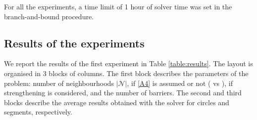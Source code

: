 \documentclass[a4paper,  review, authoryear, 1p., doubleblind]{elsarticle}
\newcommand{\TSPHN}{{\sf{H-TSPHN}\xspace }}
\newcommand{\TSPN}{{\sf{H-TSPN}\xspace }}
\begin{document}
For all the experiments, a time limit of 1 hour of solver time was set in the branch-and-bound procedure.



\subsection{Results of the experiments}
We report the results of the first experiment in Table \ref{table:results}. The layout is organised in 3 blocks of columns. The first block describes the parameters of the problem: number of neighbourhoods $|\mathcal{N}|$, if \ref{A4} is assumed or not (\TSPHN\xspace vs \TSPN), if strengthening is considered, and the number of barriers. The second and third blocks describe the average results obtained with the solver for circles and segments, respectively. 

\end{document}
